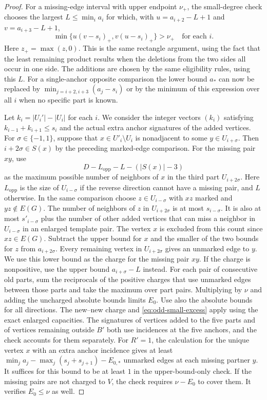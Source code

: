 \begin{proof}
For a missing-edge interval with upper endpoint $\nu_+$, the small-degree
check chooses the largest $L\leq\min_i a_i$ for which, with
$u=a_{i+2}-L+1$ and $v=a_{i+3}-L+1$,
\[
 \min\{u(v-s_i)_+,v(u-s_i)_+\}>\nu_+\quad\text{for each }i .
\]
Here $z_+=\max(z,0)$. This is the same rectangle argument,
using the fact that the least remaining product results when the
deletions from the two sides all occur in one side. The additions
are chosen by the same eligibility rules, using this $L$. For a
single-anchor opposite comparison the lower bound $a_*$ can now
be replaced by $\min_{j=i+2,i+3}(a_j-s_i)$ or by the minimum of
this expression over all $i$ when no specific part is known.

Let $k_i=|U_i'|-|U_i|$ for each $i$. We consider the integer vectors $(k_i)$ satisfying $k_{i-1}+k_{i+1}\leq s_i$
and the actual extra anchor signatures of the added vertices.
For $\sigma\in\{-1,1\}$, suppose that $x\in U'_i\setminus U_i$
is nonadjacent to some $y\in U_{i+\sigma}$. Then
$i+2\sigma\in S(x)$ by the preceding marked-edge comparison.
For the missing pair $xy$, use
\[
 D-L_{\mathrm{opp}}-L-(|S(x)|-3)
\]
as the maximum possible number of neighbors of $x$ in the third
part $U_{i+2\sigma}$. Here $L_{\mathrm{opp}}$ is the size of
$U_{i-\sigma}$ if the reverse direction cannot have a missing
pair, and $L$ otherwise. In the same comparison choose
$z\in U_{i-\sigma}$ with $xz$ marked and $yz\notin E(G)$. The
number of neighbors of $z$ in $U_{i+2\sigma}$ is at most
$s_{i-\sigma}$. It is also at most $s'_{i-\sigma}$ plus the
number of other added vertices that can miss a neighbor in
$U_{i-\sigma}$ in an enlarged template pair. The vertex $x$ is
excluded from this count since $xz\in E(G)$. Subtract the upper
bound for $x$ and the smaller of the two bounds for $z$ from
$a_{i+2\sigma}$. Every remaining vertex in $U_{i+2\sigma}$ gives
an unmarked edge to $y$. We use this lower bound as the charge for
the missing pair $xy$. If the charge is
nonpositive, use the upper bound $a_{i+\sigma}-L$ instead.
For each pair of consecutive old parts, sum the reciprocals of the
positive charges that use unmarked edges between those parts and take the maximum over part pairs. Multiplying by $\nu$
and adding the uncharged absolute bounds limits $E_0$. Use also the
absolute bounds for all directions. The new--new charge and
\eqref{eq:odd-small-excess} apply using the exact enlarged capacities.
The signatures of vertices added to the five parts and of vertices remaining
outside $B'$ both use incidences at the five anchors, and the
check accounts for them separately. For $R'=1$, the calculation
for the unique vertex $x$ with an extra anchor incidence gives at
least $\min_j a_j-\max_j(s_j+s_{j+1})-E_{0,*}$ unmarked edges at each
missing partner $y$. It suffices for this bound to be at least $1$
in the upper-bound-only check. If the missing pairs are not charged
to $V$, the check requires $\nu-E_0$ to cover them. It verifies
$E_0\leq \nu$ as well.


\end{proof}
